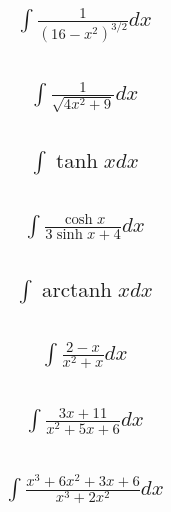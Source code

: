 \documentclass{article}
\DeclareMathOperator{\arctanh}{arctanh}
\begin{document}
\subsection{
	\begin{align*}
		\int{\frac{1}{(16 - x^2)^{3/2}} dx}
	\end{align*}
}

\subsection{
	\begin{align*}
		\int{\frac{1}{\sqrt{4x^2 + 9}}dx}
	\end{align*}
}

\subsection{
	\begin{align*}
		\int{\tanh{x} dx}
	\end{align*}
}

\subsection{
	\begin{align*}
		\int{\frac{\cosh{x}}{3\sinh{x} + 4} dx}
	\end{align*}
}

\subsection{
	\begin{align*}
		\int{\arctanh{x} dx}
	\end{align*}
}

\subsection{
	\begin{align*}
		\int{\frac{2 - x}{x^2 + x} dx}
	\end{align*}
}

\subsection{
	\begin{align*}
		\int{\frac{3x + 11}{x^2 + 5x + 6} dx}
	\end{align*}
}

\subsection{
	\begin{align*}
		\int{\frac{x^3 + 6x^2 + 3x + 6}{x^3 + 2x^2} dx}
	\end{align*}
}
\end{document}
